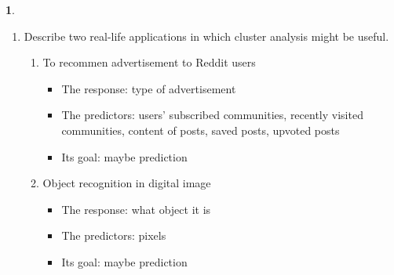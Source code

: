 \documentclass[12pt]{article}
\theoremstyle{definition}
\newtheorem{problem}{}
\begin{document}
\begin{problem}
\begin{enumerate}
			\item Describe two real-life applications in which cluster analysis might be useful.
				\begin{enumerate}
					\item To recommen advertisement to Reddit users
						\begin{itemize}
							\item The response: type of advertisement
							\item The predictors: users' subscribed communities, recently visited communities, content of posts, saved posts, upvoted posts 
							\item Its goal: maybe prediction						
						\end{itemize}
					\item Object recognition in digital image
						\begin{itemize}
							\item The response: what object it is
							\item The predictors: pixels
							\item Its goal: maybe prediction
						\end{itemize}
				\end{enumerate}

		\end{enumerate}
	\end{problem}
\end{document}
